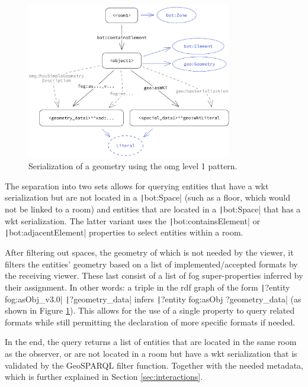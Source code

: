 \begin{figure}[H]
    \centering
    \includegraphics[width=0.8\textwidth]{figures/pdf/omg1.pdf}
    \caption[Serialization, \acs{omg} level 1]{Serialization of a geometry using the \acs{omg} level 1 pattern.}
    \label{fig:omg1}
\end{figure}


The separation into two sets allows for querying entities that have a \ac{wkt} serialization but are not located in a \texttt|bot:Space| (such as a floor, which would not be linked to a room) and entities that are located in a \texttt|bot:Space| that has a \ac{wkt} serialization. The latter variant uses the \texttt|bot:containsElement| or \texttt|bot:adjacentElement| properties to select entities within a room.

After filtering out spaces, the geometry of which is not needed by the viewer, it filters the entities' geometry based on a list of implemented/accepted formats by the receiving viewer. These last consist of a list of \ac{fog} super-properties inferred by their assignment. In other words: a triple in the \ac{rdf} graph of the form \texttt|?entity fog:asObj_v3.0| \texttt|?geometry_data| infers \texttt|?entity fog:asObj ?geometry_data| (as shown in Figure \ref{fig:omg1}). This allows for the use of a single property to query related formats while still permitting the declaration of more specific formats if needed.

In the end, the query returns a list of entities that are located in the same room as the observer, or are not located in a room but have a \ac{wkt} serialization that is validated by the GeoSPARQL filter function. Together with the needed metadata, which is further explained in Section \ref{sec:interactions}.

